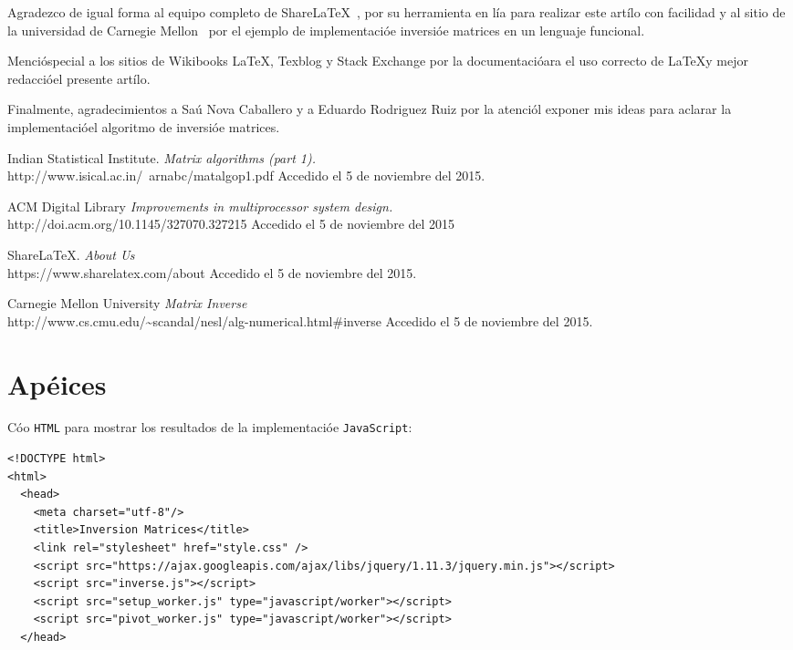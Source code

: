\documentclass[10pt,letterpaper,oneside]{article}
\begin{document}
{Agradezco de igual forma al equipo completo de ShareLaTeX~\cite{sharelatex}, por su herramienta en lía para realizar este artílo con facilidad y al sitio de la universidad de Carnegie Mellon~\cite{implementacion} por el ejemplo de implementacióe inversióe matrices en un lenguaje funcional.

Mencióspecial a los sitios de Wikibooks \LaTeX {}, Texblog  y Stack Exchange  por la documentacióara el uso correcto de \LaTeX y mejor redaccióel presente artílo. 

Finalmente, agradecimientos a Saú Nova Caballero y a Eduardo Rodriguez Ruiz por la atenciól exponer mis ideas para aclarar la implementacióel algoritmo de inversióe matrices.

 \theendnotes
 
\begin{thebibliography}{9}
    
    Indian Statistical Institute.
    \emph{Matrix algorithms (part 1).} \\
    http://www.isical.ac.in/~arnabc/matalgop1.pdf Accedido el 5 de noviembre del 2015.
    
    ACM Digital Library
    \emph{Improvements in multiprocessor system design.} \\
    http://doi.acm.org/10.1145/327070.327215 Accedido el 5 de noviembre del 2015
    
    ShareLaTeX.
    \emph{About Us} \\
    https://www.sharelatex.com/about Accedido el 5 de noviembre del 2015.
    
    Carnegie Mellon University
    \emph{Matrix Inverse} \\
    http://www.cs.cmu.edu/\textasciitilde scandal/nesl/alg-numerical.html\#inverse Accedido el 5 de noviembre del 2015.
    
    
\end{thebibliography}

\section{Apéices}

Cóo \verb!HTML! para mostrar los resultados de la implementacióe \verb!JavaScript!:
\begin{verbatim}
<!DOCTYPE html>
<html>
  <head>
    <meta charset="utf-8"/>
    <title>Inversion Matrices</title>
    <link rel="stylesheet" href="style.css" />
    <script src="https://ajax.googleapis.com/ajax/libs/jquery/1.11.3/jquery.min.js"></script>
    <script src="inverse.js"></script>
    <script src="setup_worker.js" type="javascript/worker"></script>
    <script src="pivot_worker.js" type="javascript/worker"></script>
  </head>


\end{verbatim}}
\end{document}
